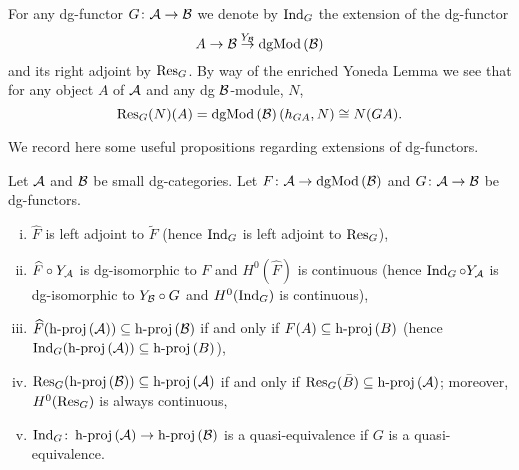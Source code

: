 \documentclass[dissertation.tex]{subfiles}
\begin{document}
For any dg-functor \(G \colon \A \to \B\) we denote by \(\Ind{G}\) the extension of the dg-functor
\[A \to \B \overset{Y_\B}\to \dgMod{\B}\]
and its right adjoint by \(\Res{G}\).
By way of the enriched Yoneda Lemma we see that for any object \(A\) of \(\A\) and any dg \(\B\)-module, \(N\), 
\[\Res{G}(N)(A) = \dgMod{\B}(h_{GA}, N) \cong N(GA).\]

We record here some useful propositions regarding extensions of dg-functors.

\begin{proposition}[{\cite[Prop 3.2]{CS}}]
  Let \(\A\) and \(\B\) be small dg-categories.
  Let \(F \colon \A \to \dgMod{\B}\) and \(G \colon \A \to \B\) be dg-functors.
  \begin{enumerate}[(i)]
  \item
    \(\widehat{F}\) is left adjoint to \(\widetilde{F}\) (hence \(\Ind{G}\) is left adjoint to \(\Res{G}\)),
  \item
    \(\widehat{F} \circ Y_\A\) is dg-isomorphic to \(F\) and \(H^0(\widehat{F})\) is continuous (hence \(\Ind{G} \circ Y_\A\) is dg-isomorphic to \(Y_\B \circ G\) and \(H^0(\Ind{G})\) is continuous),
  \item
    \(\widehat{F}(\hproj{\A}) \subseteq \hproj{\B}\) if and only if \(F(A) \subseteq \hproj{B}\) (hence \(\Ind{G}(\hproj{\A}) \subseteq \hproj{B}\)),
  \item
    \(\Res{G}(\hproj{\B}) \subseteq \hproj{\A}\) if and only if \(\Res{G}(\bar{B}) \subseteq \hproj{\A}\); moreover,\\ \(H^0(\Res{G})\) is always continuous,
  \item
    \(\Ind{G} \colon \hproj{\A} \to \hproj{\B}\) is a quasi-equivalence if \(G\) is a quasi-equivalence.
  \end{enumerate}
\end{proposition}
\end{document}

